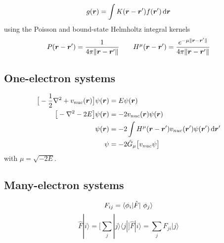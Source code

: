 \begin{equation}
    g(\boldsymbol r) = \int K(\boldsymbol r-\boldsymbol r') f(\boldsymbol r') \,\mathrm{d}\boldsymbol r
\end{equation}
using the Poisson and bound-state Helmholtz integral kernels
\begin{equation}
    P(\boldsymbol r-\boldsymbol r') = \frac{1}{4\pi\|\boldsymbol r-\boldsymbol r'\|} \qquad
    H^\mu(\boldsymbol r-\boldsymbol r') = \frac{e^{-\mu\|\boldsymbol r-\boldsymbol r'\|}}{4\pi\|\boldsymbol r-\boldsymbol r'\|}
\end{equation}

\subsection{One-electron systems}
\begin{align}
    \big[-\frac{1}{2}\nabla^2+v_{nuc}(\boldsymbol r)\big]\psi(\boldsymbol r) &= E \psi(\boldsymbol r)\\
    \big[-\nabla^2 - 2E\big]\psi(\boldsymbol r) &= -2v_{nuc}(\boldsymbol r) \psi(\boldsymbol r)\\
    \psi(\boldsymbol r) &= -2\int H^{\mu}(\boldsymbol r-\boldsymbol r')v_{nuc}(\boldsymbol r') 
	\psi(\boldsymbol r') \,\mathrm{d} \boldsymbol r'\\
    \label{eq:int_schrodinger}
    \psi &= -2 \hat{G}_{\mu}\big[v_{nuc}\psi\big]
\end{align}
with $\mu = \sqrt{-2E}$.


\subsection{Many-electron systems}

\begin{equation}
    F_{ij} = \langle \orbital_i | \hat{F} | \orbital_j \rangle
\end{equation}
\begin{equation}
    \hat{F}| i \rangle	
	= \Big[\sum_j |j \rangle\langle j|\Big] \hat{F}|i \rangle 
	= \sum_j F_{ji} |j \rangle
\end{equation}

